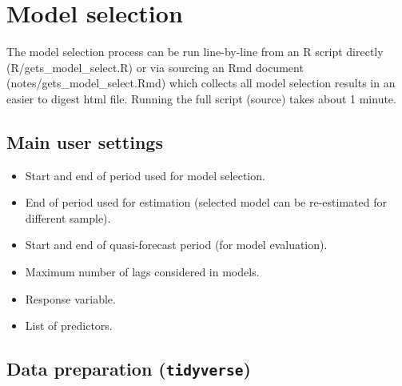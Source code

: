 \documentclass[
  letterpaper,
  DIV=11,
  numbers=noendperiod]{scrreport}
\providecommand{\tightlist}{%
  \setlength{\itemsep}{0pt}\setlength{\parskip}{0pt}}\usepackage{longtable,booktabs,array}
\begin{document}

\chapter{Model selection}\label{model-selection}

The model selection process can be run line-by-line from an R script
directly (R/gets\_model\_select.R) or via sourcing an Rmd document
(notes/gets\_model\_select.Rmd) which collects all model selection
results in an easier to digest html file. Running the full script
(source) takes about 1 minute.

\section{Main user settings}\label{main-user-settings}

\begin{itemize}
\tightlist
\item
  Start and end of period used for model selection.\\
\item
  End of period used for estimation (selected model can be re-estimated
  for different sample).\\
\item
  Start and end of quasi-forecast period (for model evaluation).\\
\item
  Maximum number of lags considered in models.\\
\item
  Response variable.\\
\item
  List of predictors.
\end{itemize}

\section{\texorpdfstring{Data preparation
(\texttt{tidyverse})}{Data preparation (tidyverse)}}\label{data-preparation-tidyverse}
\end{document}
